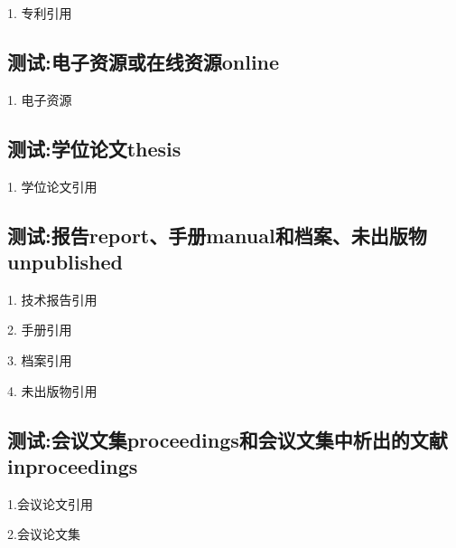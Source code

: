 \documentclass[11pt]{article} %
\begin{document}
\begin{refsection}
1. 专利引用\cite{patent3}\cite{patent2}

\printbibliography[heading=bibliography,title=【专利】]
\end{refsection}

\subsection{测试:电子资源或在线资源online}

\begin{refsection}
1. 电子资源\cite{Alliance--,online1,online2,online3}\cite{OMG2003--}

\printbibliography[heading=bibliography,title=【电子资源】]
\end{refsection}


\subsection{测试:学位论文thesis}

\begin{refsection}
1. 学位论文引用\cite{张若凌2004--}\cite{athesis1}

\printbibliography[heading=bibliography,title=【硕博士论文】]
\end{refsection}


\subsection{测试:报告report、手册manual和档案、未出版物unpublished}


\begin{refsection}
1. 技术报告引用\cite{Eggrers--,Humphrey1971--}

2. 手册引用\cite{Robertson2011--}

3. 档案引用\cite{中国第一历史档案馆2001--}

4. 未出版物引用\cite{包太雷2013--}

\printbibliography[heading=bibliography,title=【报告、手册和档案、未出版物】]
\end{refsection}


\subsection{测试:会议文集proceedings和会议文集中析出的文献inproceedings}

\begin{refsection}
1.会议论文引用
\cite{Choi2002-1075-1080,Firoozbakhsh2003-473-477,ay5,ay7,inproceeding1,贾东琴2011-45-52}

2.会议论文集
\cite{aproceedings2,aproceedings3,中国力学学会1999--}

\printbibliography[heading=bibliography,title=【会议文集和论文】]
\end{refsection}
\end{document}
